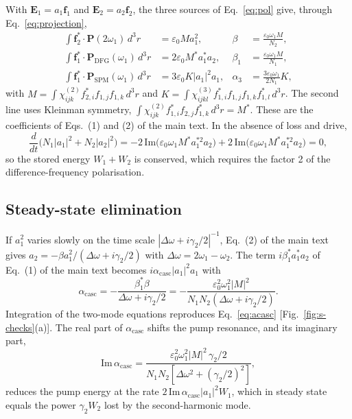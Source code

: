 \documentclass[9pt]{osa-supplemental-document}
\newcommand{\chitwo}{\chi^{(2)}}
\newcommand{\chithree}{\chi^{(3)}}
\newcommand{\Dom}{\Delta\omega}
\newcommand{\f}{\mathbf f}
\newcommand{\acasc}{\alpha_{\mathrm{casc}}}
\begin{document}
With $\mathbf E_1=a_1\f_1$ and $\mathbf E_2=a_2\f_2$, the three sources of
Eq.~\eqref{eq:pol} give, through Eq.~\eqref{eq:projection},
\begin{align}
  \int\f_2^*\cdot\mathbf P(2\omega_1)\,d^3r&=\varepsilon_0Ma_1^2,
  &\beta&=\frac{\varepsilon_0\omega_1M}{N_2},\\
  \int\f_1^*\cdot\mathbf P_{\mathrm{DFG}}(\omega_1)\,d^3r&=2\varepsilon_0M^*a_1^*a_2,
  &\beta_1&=\frac{\varepsilon_0\omega_1M}{N_1},\\
  \int\f_1^*\cdot\mathbf P_{\mathrm{SPM}}(\omega_1)\,d^3r&=3\varepsilon_0K|a_1|^2a_1,
  &\alpha_3&=\frac{3\varepsilon_0\omega_1}{2N_1}K,
\end{align}
with $M=\int\chitwo_{ijk}f^*_{2,i}f_{1,j}f_{1,k}\,d^3r$ and
$K=\int\chithree_{ijkl}f^*_{1,i}f_{1,j}f_{1,k}f^*_{1,l}\,d^3r$.  The second
line uses Kleinman symmetry,
$\int\chitwo_{ijk}f^*_{1,i}f_{2,j}f^*_{1,k}\,d^3r=M^*$.  These are the
coefficients of Eqs.~(1) and (2) of the main text.  In the absence of loss
and drive,
\begin{equation}
  \frac{d}{dt}\bigl(N_1|a_1|^2+N_2|a_2|^2\bigr)
  =-2\,\mathrm{Im}\bigl(\varepsilon_0\omega_1M^*a_1^{*2}a_2\bigr)
   +2\,\mathrm{Im}\bigl(\varepsilon_0\omega_1M^*a_1^{*2}a_2\bigr)=0 ,
\end{equation}
so the stored energy $W_1+W_2$ is conserved, which requires the factor 2
of the difference-frequency polarisation.

\subsection{Steady-state elimination}

If $a_1^2$ varies slowly on the time scale $|\Dom+i\gamma_2/2|^{-1}$,
Eq.~(2) of the main text gives $a_2=-\beta a_1^2/(\Dom+i\gamma_2/2)$ with
$\Dom=2\omega_1-\omega_2$.  The term $i\beta_1^*a_1^*a_2$ of Eq.~(1) of the
main text becomes $i\acasc|a_1|^2a_1$ with
\begin{equation}
  \acasc=-\frac{\beta_1^*\beta}{\Dom+i\gamma_2/2}
  =-\frac{\varepsilon_0^2\omega_1^2|M|^2}{N_1N_2(\Dom+i\gamma_2/2)} .
  \label{eq:acasc}
\end{equation}
Integration of the two-mode equations reproduces Eq.~\eqref{eq:acasc}
[Fig.~\ref{fig:s-checks}(a)].  The real part of $\acasc$ shifts the pump
resonance, and its imaginary part,
\begin{equation}
  \mathrm{Im}\,\acasc=\frac{\varepsilon_0^2\omega_1^2|M|^2\,\gamma_2/2}{N_1N_2[\Dom^2+(\gamma_2/2)^2]},
\end{equation}
reduces the pump energy at the rate $2\,\mathrm{Im}\,\acasc|a_1|^2W_1$,
which in steady state equals the power $\gamma_2W_2$ lost by the
second-harmonic mode.
\end{document}
